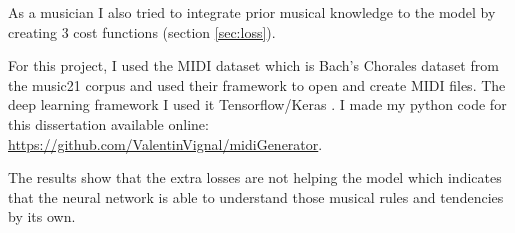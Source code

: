\documentclass[12pt]{report}
\begin{document}
As a musician I also tried to integrate prior musical knowledge to the model by creating 3 cost functions (section \ref{sec:loss}).

For this project, I used the MIDI dataset which is Bach's Chorales dataset from the music21 corpus \cite{noauthor_music21corpuschorales_nodate} and used their framework \cite{noauthor_music21_nodate} to open and create MIDI files.
The deep learning framework I used it Tensorflow/Keras \cite{noauthor_tensorflow_nodate, noauthor_keras_nodate}.
I made my python code for this dissertation available online: \url{https://github.com/ValentinVignal/midiGenerator}.

The results show that the extra losses are not helping the model which indicates that the neural network is able to understand those musical rules and tendencies by its own.


\listoftables


\listoffigures

\end{document}
